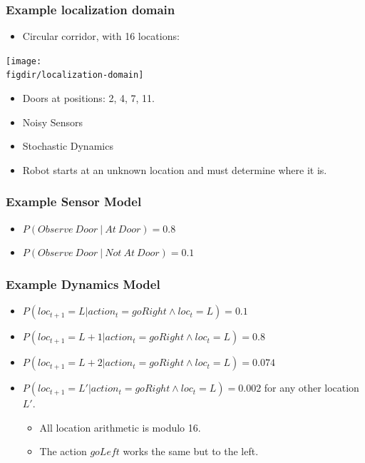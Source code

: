 \documentclass[12pt]{beamer} %
\newcommand{\figdir}{../../figures/ch06}
\begin{document}
\begin{frame}
\frametitle{Example localization domain}
\begin{itemize}
\item Circular corridor, with 16 locations:
\end{itemize}
\begin{center}
\texttt{[image: \\figdir/localization-domain]}
\end{center}
\begin{itemize}
\item Doors at positions: 2, 4, 7, 11.
\item Noisy Sensors
\item Stochastic Dynamics
\item Robot starts at an unknown location and must determine where it is.
\end{itemize}

\end{frame}

\begin{frame}
\frametitle{Example Sensor Model}
\begin{itemize}
\item $P(Observe~Door~|~At~Door) = 0.8$
\item $P(Observe~Door~|~Not~At~Door) = 0.1$
\end{itemize}
\end{frame}

\begin{frame}
\frametitle{Example Dynamics Model}
\begin{itemize}
\item $P(loc_{t+1}= L | action_t=goRight \wedge loc_{t}=L) = 0.1$
\item $P(loc_{t+1}= L+1 | action_t=goRight \wedge loc_{t}=L) = 0.8$
\item $P(loc_{t+1}= L+2 | action_t=goRight \wedge loc_{t}=L) = 0.074$
\item $P(loc_{t+1}= L' | action_t=goRight \wedge loc_{t}=L) = 0.002$
for any other location $L'$.
\begin{itemize}
\item All location arithmetic is modulo 16.
\item The action $goLeft$ works the same but to the left.
\end{itemize}

\end{itemize}
\end{frame}
\end{document}
